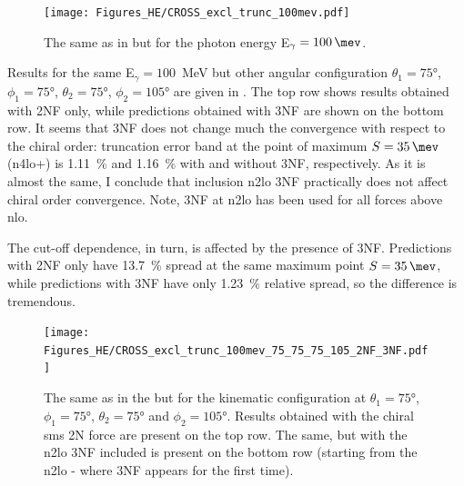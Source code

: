         \begin{figure}[h]
            \begin{center}
            \texttt{[image: Figures\_HE/CROSS\_excl\_trunc\_100mev.pdf]}
            \end{center}
            \caption{The same as in  but 
            for the photon energy E$_\gamma=\SI{100}{\mev}$.}
            \label{CROSS_HE_EXCL_100}
        \end{figure}

    Results for the same E$_\gamma=100$~MeV but other angular configuration  
    $\theta_1 = \ang{75}$, $\phi_1 = \ang{75}$,
    $\theta_2 = \ang{75}$, $\phi_2 = \ang{105}$ are
    given in .
    The top row shows results obtained with 2NF only, while predictions obtained with 3NF are shown
    on the bottom row.
    It seems that 3NF does not change much the convergence with respect to the chiral order:
    truncation error band at the point of maximum $S=\SI{35}{\mev}$ (\gls{n4lo+})
    is \SI{1.11}{\percent} and \SI{1.16}{\percent} with and without 3NF, respectively.
    As it is almost the same, I conclude that inclusion \gls{n2lo} 3NF practically
    does not affect chiral order convergence.
    Note, 3NF at \gls{n2lo} has been used for all forces above \gls{nlo}.

    The cut-off dependence, in turn, is affected by the presence of 3NF. Predictions with 2NF only have
    \SI{13.7}{\percent} spread at the same maximum point $S=\SI{35}{\mev}$, while predictions with 3NF
    have only \SI{1.23}{\percent} relative spread, so the difference is tremendous.

        \begin{figure}[h]
            \begin{center}
                \texttt{[image: Figures\_HE/CROSS\_excl\_trunc\_100mev\_75\_75\_75\_105\_2NF\_3NF.pdf]}
                \end{center}
                \caption{The same as in the  but for the kinematic
                configuration at
                $\theta_1 = \ang{75}$, $\phi_1 = \ang{75}$,
                $\theta_2 = \ang{75}$ and $\phi_2 = \ang{105}$.
                Results obtained with the chiral \gls{sms} 2N force 
                are present on the top row. The same, but
                with the \gls{n2lo} 3NF included is present on the bottom row
                (starting from the \gls{n2lo} - where 3NF appears for the first time).}
                \label{CROSS_HE_EXCL_75_75_75_105}
        \end{figure}


